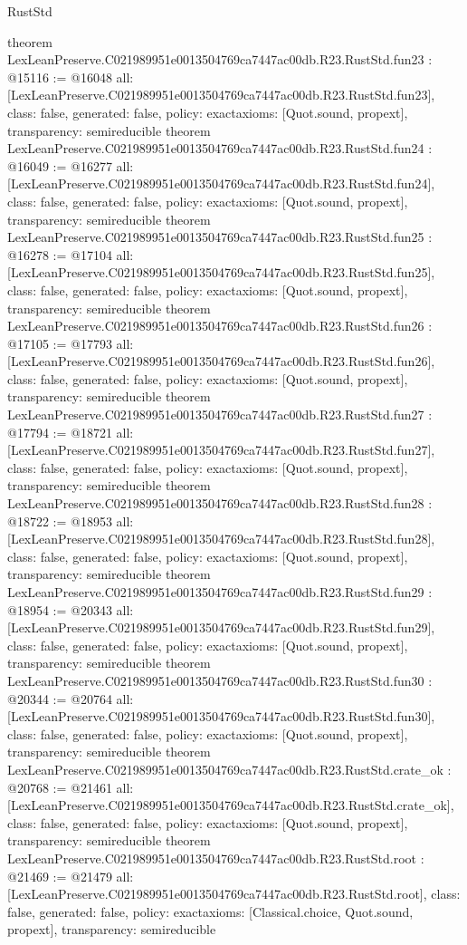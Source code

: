 \begin{lexlean}{RustStd}
\begin{coremodule}
{}
theorem LexLeanPreserve.C021989951e0013504769ca7447ac00db.R23.RustStd.fun23 : @15116 := @16048 {
  all: [LexLeanPreserve.C021989951e0013504769ca7447ac00db.R23.RustStd.fun23],
  class: false,
  generated: false,
  policy: exact{axioms: [Quot.sound, propext]},
  transparency: semireducible
}
theorem LexLeanPreserve.C021989951e0013504769ca7447ac00db.R23.RustStd.fun24 : @16049 := @16277 {
  all: [LexLeanPreserve.C021989951e0013504769ca7447ac00db.R23.RustStd.fun24],
  class: false,
  generated: false,
  policy: exact{axioms: [Quot.sound, propext]},
  transparency: semireducible
}
theorem LexLeanPreserve.C021989951e0013504769ca7447ac00db.R23.RustStd.fun25 : @16278 := @17104 {
  all: [LexLeanPreserve.C021989951e0013504769ca7447ac00db.R23.RustStd.fun25],
  class: false,
  generated: false,
  policy: exact{axioms: [Quot.sound, propext]},
  transparency: semireducible
}
theorem LexLeanPreserve.C021989951e0013504769ca7447ac00db.R23.RustStd.fun26 : @17105 := @17793 {
  all: [LexLeanPreserve.C021989951e0013504769ca7447ac00db.R23.RustStd.fun26],
  class: false,
  generated: false,
  policy: exact{axioms: [Quot.sound, propext]},
  transparency: semireducible
}
theorem LexLeanPreserve.C021989951e0013504769ca7447ac00db.R23.RustStd.fun27 : @17794 := @18721 {
  all: [LexLeanPreserve.C021989951e0013504769ca7447ac00db.R23.RustStd.fun27],
  class: false,
  generated: false,
  policy: exact{axioms: [Quot.sound, propext]},
  transparency: semireducible
}
theorem LexLeanPreserve.C021989951e0013504769ca7447ac00db.R23.RustStd.fun28 : @18722 := @18953 {
  all: [LexLeanPreserve.C021989951e0013504769ca7447ac00db.R23.RustStd.fun28],
  class: false,
  generated: false,
  policy: exact{axioms: [Quot.sound, propext]},
  transparency: semireducible
}
theorem LexLeanPreserve.C021989951e0013504769ca7447ac00db.R23.RustStd.fun29 : @18954 := @20343 {
  all: [LexLeanPreserve.C021989951e0013504769ca7447ac00db.R23.RustStd.fun29],
  class: false,
  generated: false,
  policy: exact{axioms: [Quot.sound, propext]},
  transparency: semireducible
}
theorem LexLeanPreserve.C021989951e0013504769ca7447ac00db.R23.RustStd.fun30 : @20344 := @20764 {
  all: [LexLeanPreserve.C021989951e0013504769ca7447ac00db.R23.RustStd.fun30],
  class: false,
  generated: false,
  policy: exact{axioms: [Quot.sound, propext]},
  transparency: semireducible
}
theorem LexLeanPreserve.C021989951e0013504769ca7447ac00db.R23.RustStd.crate_ok : @20768 := @21461 {
  all: [LexLeanPreserve.C021989951e0013504769ca7447ac00db.R23.RustStd.crate_ok],
  class: false,
  generated: false,
  policy: exact{axioms: [Quot.sound, propext]},
  transparency: semireducible
}
theorem LexLeanPreserve.C021989951e0013504769ca7447ac00db.R23.RustStd.root : @21469 := @21479 {
  all: [LexLeanPreserve.C021989951e0013504769ca7447ac00db.R23.RustStd.root],
  class: false,
  generated: false,
  policy: exact{axioms: [Classical.choice, Quot.sound, propext]},
  transparency: semireducible
}


\end{coremodule}
\end{lexlean}
